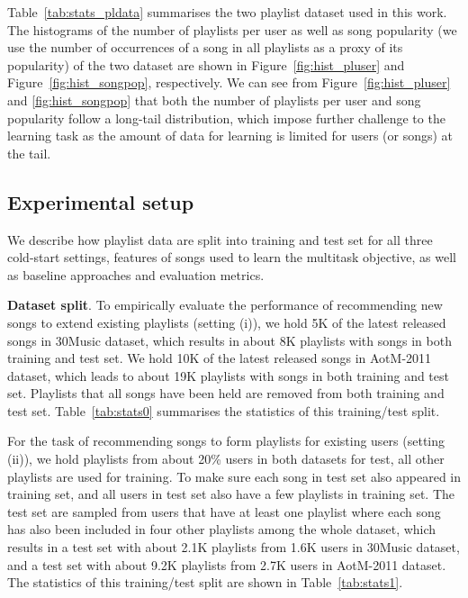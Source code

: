 Table~\ref{tab:stats_pldata} summarises the two playlist dataset used in this work.
The histograms of the number of playlists per user as well as song popularity 
(\ie we use the number of occurrences of a song in all playlists as a proxy of its popularity)
of the two dataset are shown in Figure~\ref{fig:hist_pluser} and Figure~\ref{fig:hist_songpop},
respectively.
We can see from Figure~\ref{fig:hist_pluser} and \ref{fig:hist_songpop} that both the number
of playlists per user and song popularity follow a long-tail distribution, which impose further challenge to the learning task as the amount
of data for learning is limited for users (or songs) at the tail.






\subsection{Experimental setup}

We describe how playlist data are split into training and test set for all three cold-start settings,
features of songs used to learn the multitask objective, as well as baseline approaches and evaluation metrics.

{\bf Dataset split}.
To empirically evaluate the performance of recommending new songs to extend existing playlists (setting (i)),
we hold 5K of the latest released songs in 30Music dataset, which results in about 8K playlists with songs
in both training and test set.
We hold 10K of the latest released songs in AotM-2011 dataset, which leads to about 19K playlists with songs
in both training and test set.
Playlists that all songs have been held are removed from both training and test set.
Table~\ref{tab:stats0} summarises the statistics of this training/test split.

For the task of recommending songs to form playlists for existing users (setting (ii)),
we hold playlists from about 20\% users in both datasets for test, all other playlists are used for training.
To make sure each song in test set also appeared in training set,
and all users in test set also have a few playlists in training set.
The test set are sampled from users that have at least one playlist where each song has also been
included in four other playlists among the whole dataset,
which results in a test set with about 2.1K playlists from 1.6K users in 30Music dataset,
and a test set with about 9.2K playlists from 2.7K users in AotM-2011 dataset.
The statistics of this training/test split are shown in Table~\ref{tab:stats1}.


